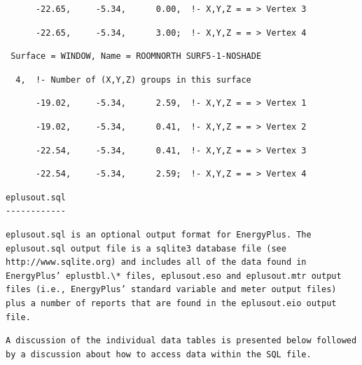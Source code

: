 \begin{lstlisting}
      -22.65,     -5.34,      0.00,  !- X,Y,Z = = > Vertex 3
\end{lstlisting}

\begin{lstlisting}
      -22.65,     -5.34,      3.00;  !- X,Y,Z = = > Vertex 4
\end{lstlisting}

\begin{lstlisting}
 Surface = WINDOW, Name = ROOMNORTH SURF5-1-NOSHADE
\end{lstlisting}

\begin{lstlisting}
  4,  !- Number of (X,Y,Z) groups in this surface
\end{lstlisting}

\begin{lstlisting}
      -19.02,     -5.34,      2.59,  !- X,Y,Z = = > Vertex 1
\end{lstlisting}

\begin{lstlisting}
      -19.02,     -5.34,      0.41,  !- X,Y,Z = = > Vertex 2
\end{lstlisting}

\begin{lstlisting}
      -22.54,     -5.34,      0.41,  !- X,Y,Z = = > Vertex 3
\end{lstlisting}

\begin{lstlisting}
      -22.54,     -5.34,      2.59;  !- X,Y,Z = = > Vertex 4
\end{lstlisting}

\begin{lstlisting}
eplusout.sql
------------
\end{lstlisting}

\begin{lstlisting}
eplusout.sql is an optional output format for EnergyPlus. The eplusout.sql output file is a sqlite3 database file (see http://www.sqlite.org) and includes all of the data found in EnergyPlus’ eplustbl.\* files, eplusout.eso and eplusout.mtr output files (i.e., EnergyPlus’ standard variable and meter output files) plus a number of reports that are found in the eplusout.eio output file.
\end{lstlisting}

\begin{lstlisting}
A discussion of the individual data tables is presented below followed by a discussion about how to access data within the SQL file.
\end{lstlisting}

